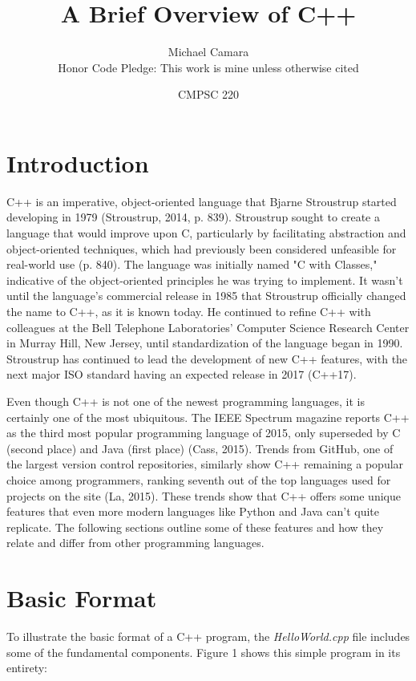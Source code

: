 \documentclass[11pt]{article}
\begin{document}
\title{A Brief Overview of C++}
\author{Michael Camara\\Honor Code Pledge: This work is mine unless otherwise cited}
\date{CMPSC 220}

\maketitle

\section{Introduction}

	C++ is an imperative, object-oriented language that Bjarne Stroustrup started developing in 1979 (Stroustrup, 2014, p. 839).  Stroustrup sought to create a language that would improve upon C, particularly by facilitating abstraction and object-oriented techniques, which had previously been considered unfeasible for real-world use (p. 840).  The language was initially named "C with Classes," indicative of the object-oriented principles he was trying to implement.  It wasn't until the language's commercial release in 1985 that Stroustrup officially changed the name to C++, as it is known today.  He continued to refine C++ with colleagues at the Bell Telephone Laboratories' Computer Science Research Center in Murray Hill, New Jersey, until standardization of the language began in 1990.  Stroustrup has continued to lead the development of new C++ features, with the next major ISO standard having an expected release in 2017 (C++17).

	Even though C++ is not one of the newest programming languages, it is certainly one of the most ubiquitous.  The IEEE Spectrum magazine reports C++ as the third most popular programming language of 2015, only superseded by C (second place) and Java (first place) (Cass, 2015).  Trends from GitHub, one of the largest version control repositories, similarly show C++ remaining a popular choice among programmers, ranking seventh out of the top languages used for projects on the site (La, 2015).  These trends show that C++ offers some unique features that even more modern languages like Python and Java can't quite replicate.  The following sections outline some of these features and how they relate and differ from other programming languages.

\section{Basic Format}
	To illustrate the basic format of a C++ program, the \textit{HelloWorld.cpp} file includes some of the fundamental components.  Figure 1 shows this simple program in its entirety:
\end{document}
